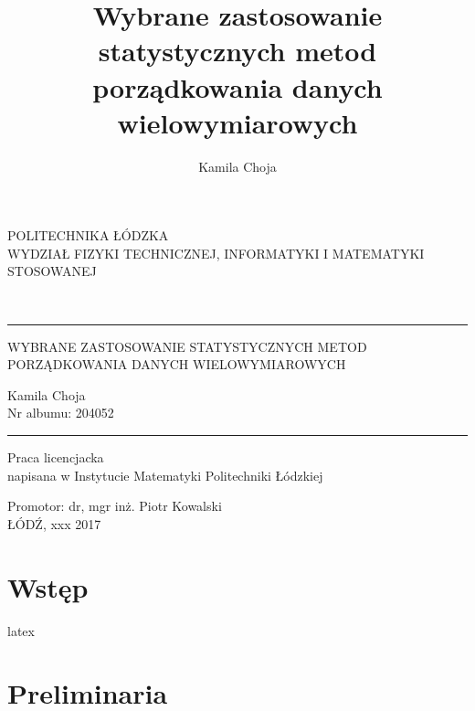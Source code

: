 \documentclass[12pt,a4paper]{report}
\author{Kamila Choja}
\title{Wybrane zastosowanie statystycznych metod porządkowania danych wielowymiarowych}
\begin{document}
\begin{titlepage}
\begin{center}
        \vspace*{1cm}
        {\large POLITECHNIKA ŁÓDZKA}\\
       \vspace*{1cm}
        {\large WYDZIAŁ FIZYKI TECHNICZNEJ, INFORMATYKI I MATEMATYKI STOSOWANEJ}\\
        \vspace*{2cm}
    \end{center}        
        
\\
\vspace*{0.3cm}
\hspace*{0.3cm}
  
\begin{center}
\rule{\textwidth}{0.5pt}

\vspace*{0.5cm}
   
{\large WYBRANE ZASTOSOWANIE STATYSTYCZNYCH METOD\\ }
{\large PORZĄDKOWANIA DANYCH WIELOWYMIAROWYCH\\}
\vspace*{1cm}


\begin{flushright}
Kamila Choja\\
Nr albumu: 204052 
 \end{flushright}
\rule{\textwidth}{0.5pt}

Praca licencjacka\\
napisana w Instytucie Matematyki Politechniki Łódzkiej\\

\vspace*{2cm}

Promotor: dr, mgr inż. Piotr Kowalski\\
\vfill
ŁÓDŹ, xxx 2017


     \end{center}   
\end{titlepage}

\tableofcontents

\chapter{Wstęp}

\Gls{latex}

\chapter{Preliminaria}  
\end{document}

